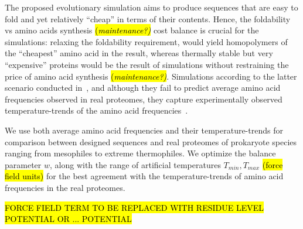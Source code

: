 \documentclass[10pt,letterpaper]{article}
\begin{document}
The proposed evolutionary simulation aims to produce sequences that are easy to fold and yet relatively ``cheap'' in terms of their contents. Hence, the foldability vs amino acids synthesis \hl{(\it maintenance?)} cost balance is crucial for the simulations: relaxing the foldability requirement, would yield homopolymers of the ``cheapest'' amino acid in the result, whereas thermally stable but very ``expensive'' proteins would be the result of simulations without restraining the price of amino acid synthesis \hl{(\it maintenance?)}. Simulations according to the latter scenario conducted in~\cite{Berezovsky2007Positive}, and although they fail to predict average amino acid frequencies observed in real proteomes, they capture experimentally observed temperature-trends of the amino acid frequencies~\cite{Szilagyi2000Structural,Haney1999Thermal,Kumar2001How,Singer2003Thermophilic}. 

We use both average amino acid frequencies and their temperature-trends for comparison between designed sequences and real proteomes of prokaryote species ranging from mesophiles to extreme thermophiles. We optimize the balance parameter $\mathit{w}$, along with the range of artificial temperatures $T_{min},T_{max}$ \hl{(force field units)} for the best agreement with the temperature-trends of amino acid frequencies in the real proteomes.


\hl{FORCE FIELD TERM TO BE REPLACED WITH RESIDUE LEVEL POTENTIAL OR ... POTENTIAL}
\end{document}

